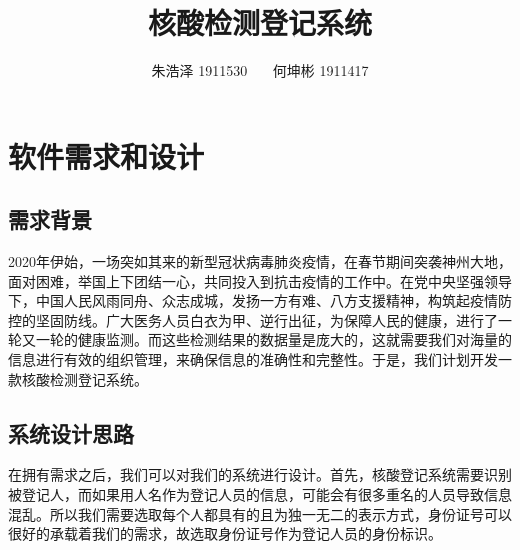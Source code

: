 \documentclass{article}
\begin{document}
\title{核酸检测登记系统}
\author{朱浩泽 1911530 \ \ \ 何坤彬 1911417}
\maketitle
\section{软件需求和设计}
\large
\subsection{需求背景}
2020年伊始，一场突如其来的新型冠状病毒肺炎疫情，在春节期间突袭神州大地，面对困难，举国上下团结一心，共同投入到抗击疫情的工作中。在党中央坚强领导下，中国人民风雨同舟、众志成城，发扬一方有难、八方支援精神，构筑起疫情防控的坚固防线。广大医务人员白衣为甲、逆行出征，为保障人民的健康，进行了一轮又一轮的健康监测。而这些检测结果的数据量是庞大的，这就需要我们对海量的信息进行有效的组织管理，来确保信息的准确性和完整性。于是，我们计划开发一款核酸检测登记系统。
\subsection{系统设计思路}
在拥有需求之后，我们可以对我们的系统进行设计。首先，核酸登记系统需要识别被登记人，而如果用人名作为登记人员的信息，可能会有很多重名的人员导致信息混乱。所以我们需要选取每个人都具有的且为独一无二的表示方式，身份证号可以很好的承载着我们的需求，故选取身份证号作为登记人员的身份标识。
\end{document}
